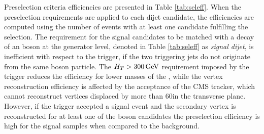 
Preselection criteria efficiencies are presented in Table \ref{tab:seleff}.  
When the preselection requirements are applied to each dijet candidate,
the efficiencies are computed using the number of events with at least one candidate fulfilling the selection.
The requirement for the signal candidates to be matched with a decay of an \X boson at the generator level,
 denoted in Table \ref{tab:seleff} as {\it signal dijet}, 
is inefficient with respect to the trigger, if the two triggering
jets do not originate from the same \X boson particle.  
The $H_T>300\,\text{Ge\hspace{-.08em}V}$ requirement imposed by the trigger reduces the efficiency for lower masses of the \Higgs, 
while the vertex reconstruction efficiency is affected by the acceptance of the CMS tracker, which cannot 
reconstruct vertices displaced by more than 60\cm in the transverse plane. However, if the trigger accepted a signal event and the secondary vertex is reconstructed
for at least one of the \X boson candidates the preselection efficiency is high for the signal samples
when compared to the background.   

